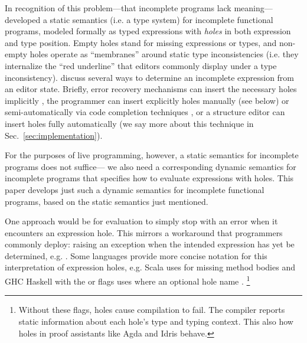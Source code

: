 In recognition of this problem---that incomplete programs lack meaning---%
\citet{popl-paper} developed a static semantics (i.e. a type system) for incomplete 
functional programs, modeled formally as typed expressions with \emph{holes} in 
both expression and type position. 
Empty holes stand for missing expressions or types,
and non-empty holes operate as ``membranes'' around static type inconsistencies 
(i.e. they internalize the ``red underline'' that editors commonly display under a type inconsistency).
\citet{popl-paper,HazelnutSNAPL} discuss several ways to determine an incomplete expression from an editor state. 
Briefly, error recovery mechanisms can insert the necessary holes implicitly \cite{DBLP:journals/siamcomp/AhoP72,charles1991practical,graham1979practical,DBLP:conf/oopsla/KatsJNV09,DBLP:conf/oopsla/KatsV10},
the programmer can insert explicitly holes manually (see below) 
or semi-automatically via code completion techniques \cite{Amorim2016}, 
or a structure editor can insert holes fully automatically \cite{popl-paper} (we say more about this technique in Sec.~\ref{sec:implementation}).

For the purposes of live programming, however, a static semantics for incomplete programs does not suffice---%
we also need a corresponding dynamic semantics for incomplete programs that specifies how to evaluate expressions with holes.
%
This paper develops
just such a dynamic semantics for incomplete functional programs, 
based on the static semantics just mentioned.

One approach would be for evaluation to simply stop with an error when it encounters an expression hole.
This mirrors a workaround that programmers commonly deploy: 
raising an exception when the intended expression has yet be determined, e.g. . 
Some languages provide more concise notation for this interpretation of expression holes, 
e.g. Scala uses  for missing method bodies 
and GHC Haskell with the  or  flags uses  where  \IS an optional hole name \cite{GHCWIKI}.%
\footnote{Without these flags, holes cause compilation to fail. The compiler reports static information about each hole's type and typing context. 
This \IS also how holes in proof assistants like Agda \cite{norell:thesis,norell2009dependently} and Idris \cite{brady2013idris} behave.}


